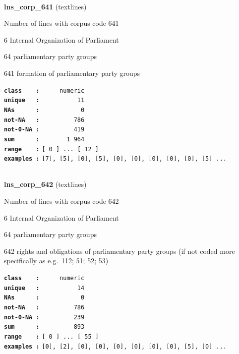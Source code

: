 \documentclass[]{article}
\begin{document}
~

\textbf{lns\_corp\_641} (textlines)

Number of lines with corpus code 641

6 Internal Organization of Parliament

64 parliamentary party groups

641 formation of parliamentary party groups

\textbf{\texttt{class\ \ \ \ :}} \texttt{~~~~~numeric}\\
\textbf{\texttt{unique\ \ \ :}} \texttt{~~~~~~~~~~11}\\
\textbf{\texttt{NAs\ \ \ \ \ \ :}} \texttt{~~~~~~~~~~~0}\\
\textbf{\texttt{not-NA\ \ \ :}} \texttt{~~~~~~~~~786}\\
\textbf{\texttt{not-0-NA\ :}} \texttt{~~~~~~~~~419}\\
\textbf{\texttt{sum\ \ \ \ \ \ :}} \texttt{~~~~~~~1~964}\\
\textbf{\texttt{range\ \ \ \ :}}
\texttt{{[}\ 0\ {]}\ ...\ {[}\ 12\ {]}}\\
\textbf{\texttt{examples\ :}}
\texttt{{[}7{]},\ {[}5{]},\ {[}0{]},\ {[}5{]},\ {[}0{]},\ {[}0{]},\ {[}0{]},\ {[}0{]},\ {[}0{]},\ {[}5{]}\ ...}\\

~

\textbf{lns\_corp\_642} (textlines)

Number of lines with corpus code 642

6 Internal Organization of Parliament

64 parliamentary party groups

642 rights and obligations of parliamentary party groups (if not coded
more specifically as e.g.~112; 51; 52; 53)

\textbf{\texttt{class\ \ \ \ :}} \texttt{~~~~~numeric}\\
\textbf{\texttt{unique\ \ \ :}} \texttt{~~~~~~~~~~14}\\
\textbf{\texttt{NAs\ \ \ \ \ \ :}} \texttt{~~~~~~~~~~~0}\\
\textbf{\texttt{not-NA\ \ \ :}} \texttt{~~~~~~~~~786}\\
\textbf{\texttt{not-0-NA\ :}} \texttt{~~~~~~~~~239}\\
\textbf{\texttt{sum\ \ \ \ \ \ :}} \texttt{~~~~~~~~~893}\\
\textbf{\texttt{range\ \ \ \ :}}
\texttt{{[}\ 0\ {]}\ ...\ {[}\ 55\ {]}}\\
\textbf{\texttt{examples\ :}}
\texttt{{[}0{]},\ {[}2{]},\ {[}0{]},\ {[}0{]},\ {[}0{]},\ {[}0{]},\ {[}0{]},\ {[}0{]},\ {[}5{]},\ {[}0{]}\ ...}\\
\end{document}
